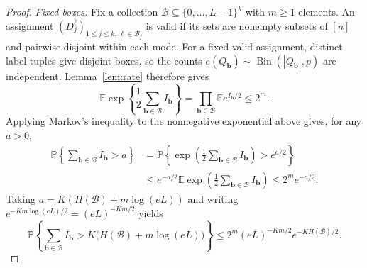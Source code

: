 \documentclass[10pt,a4paper]{amsart}
\numberwithin{equation}{section}
\newcommand{\E}{\mathbb E}
\newcommand{\Pp}{\mathbb P}
\begin{document}
\begin{proof}
\emph{Fixed boxes.}
Fix a collection $\mathcal B\subseteq\{0,\ldots,L-1\}^k$ with $m\ge1$ elements.
An assignment $(D_j^\ell)_{1\le j\le k,\,\ell\in\mathcal B_j}$ is valid
if its sets are nonempty subsets of $[n]$ and pairwise disjoint within each mode.
For a fixed valid assignment, distinct label tuples give disjoint boxes,
so the counts $e(Q_{\mathbf{b}})\sim\operatorname{Bin}(|Q_{\mathbf{b}}|,p)$ are independent.
Lemma~\ref{lem:rate} therefore gives
\[
 \E\exp\left\{\frac12\sum_{\mathbf{b}\in\mathcal B}I_{\mathbf{b}}\right\}
 =\prod_{\mathbf{b}\in\mathcal B}\E e^{I_{\mathbf{b}}/2}\le2^m.
\]
 Applying Markov's
inequality to the nonnegative exponential above gives, for any $a>0$,
\begin{align*}
 \Pp\left\{\sum_{\mathbf{b}\in\mathcal B}I_{\mathbf{b}}>a\right\}
 &=\Pp\left\{\exp\left(\frac12\sum_{\mathbf{b}\in\mathcal B}I_{\mathbf{b}}\right)
                    >e^{a/2}\right\}\\
 &\le e^{-a/2}\E\exp\left(\frac12\sum_{\mathbf{b}\in\mathcal B}I_{\mathbf{b}}\right)
 \le2^m e^{-a/2}.
\end{align*}
Taking $a=K(H(\mathcal B)+m\log(eL))$ and writing
$e^{-Km\log(eL)/2}=(eL)^{-Km/2}$ yields
\begin{equation}\label{eq:fixed-budget-tail}
 \Pp\left\{\sum_{\mathbf{b}\in\mathcal B}I_{\mathbf{b}}>
       K\bigl(H(\mathcal B)+m\log(eL)\bigr)\right\}
 \le2^m(eL)^{-Km/2}e^{-KH(\mathcal B)/2}.
\end{equation}



\end{proof}
\end{document}
